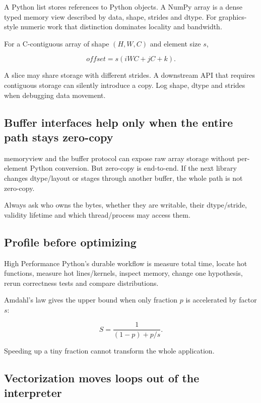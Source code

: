 A Python list stores references to Python objects. A NumPy array is a dense typed memory view described by data, shape, strides and dtype. For graphics-style numeric work that distinction dominates locality and bandwidth.

For a C-contiguous array of shape \((H,W,C)\) and element size \(s\),

\[
offset=s(iWC+jC+k).
\]

A slice may share storage with different strides. A downstream API that requires contiguous storage can silently introduce a copy. Log shape, dtype and strides when debugging data movement.

\subsection{Buffer interfaces help only when the entire path stays zero-copy}\label{01-foundations-i-ch017-buffer-interfaces-help-only-when-the-entire-path-stays-zero-copy}

memoryview and the buffer protocol can expose raw array storage without per-element Python conversion. But zero-copy is end-to-end. If the next library changes dtype/layout or stages through another buffer, the whole path is not zero-copy.

Always ask who owns the bytes, whether they are writable, their dtype/stride, validity lifetime and which thread/process may access them.

\subsection{Profile before optimizing}\label{01-foundations-i-ch017-profile-before-optimizing}

High Performance Python's durable workflow is measure total time, locate hot functions, measure hot lines/kernels, inspect memory, change one hypothesis, rerun correctness tests and compare distributions.

Amdahl's law gives the upper bound when only fraction \(p\) is accelerated by factor \(s\):

\[
S=\frac{1}{(1-p)+p/s}.
\]

Speeding up a tiny fraction cannot transform the whole application.

\subsection{Vectorization moves loops out of the interpreter}\label{01-foundations-i-ch017-vectorization-moves-loops-out-of-the-interpreter}

